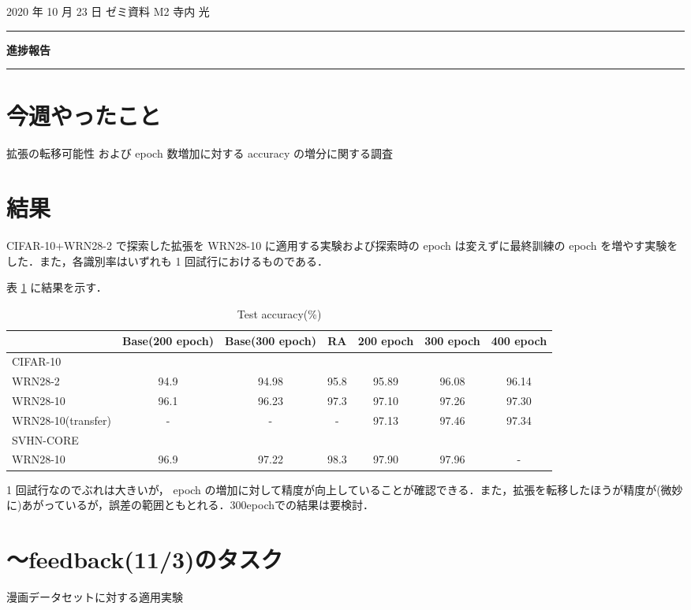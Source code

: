 \documentclass[onecolumn]{ujarticle}   %
\begin{document}
	\noindent

	\hspace{1em}
	2020 年 10 月 23 日
	ゼミ資料
	\hfill
	M2 寺内 光

	\vspace{2mm}

	\hrule

	\begin{center}
		{\Large \bf 進捗報告}
	\end{center}

	\hrule
	\vspace{3mm}

	\section{今週やったこと}
	拡張の転移可能性 および epoch 数増加に対する accuracy の増分に関する調査

  \section{結果}
  CIFAR-10+WRN28-2 で探索した拡張を WRN28-10 に適用する実験および探索時の epoch は変えずに最終訓練の epoch を増やす実験をした．また，各識別率はいずれも 1 回試行におけるものである．

  表 \ref{tab:compare_experiments} に結果を示す．
  \begin{table}[ht]
		\centering
		\caption{Test accuracy(\%)}
		\label{tab:compare_experiments}
		\begin{tabular}{l||c c c c c c} \hline
		  &Base(200 epoch)&Base(300 epoch)&RA&200 epoch&300 epoch&400 epoch\\ \hline
			CIFAR-10 &&&&&&\\
      WRN28-2&94.9&94.98&95.8&95.89&96.08&96.14\\
			WRN28-10&96.1&96.23&97.3&97.10&97.26&97.30\\
      WRN28-10(transfer)&-&-&-&97.13&97.46&97.34\\ \hline
      SVHN-CORE &&&&&&\\
      WRN28-10&96.9&97.22&98.3&97.90&97.96&- \\
		\end{tabular}
	\end{table}

  1 回試行なのでぶれは大きいが， epoch の増加に対して精度が向上していることが確認できる．また，拡張を転移したほうが精度が(微妙に)あがっているが，誤差の範囲ともとれる．300epochでの結果は要検討．


  \section{〜feedback(11/3)のタスク}
  漫画データセットに対する適用実験

\end{document}

